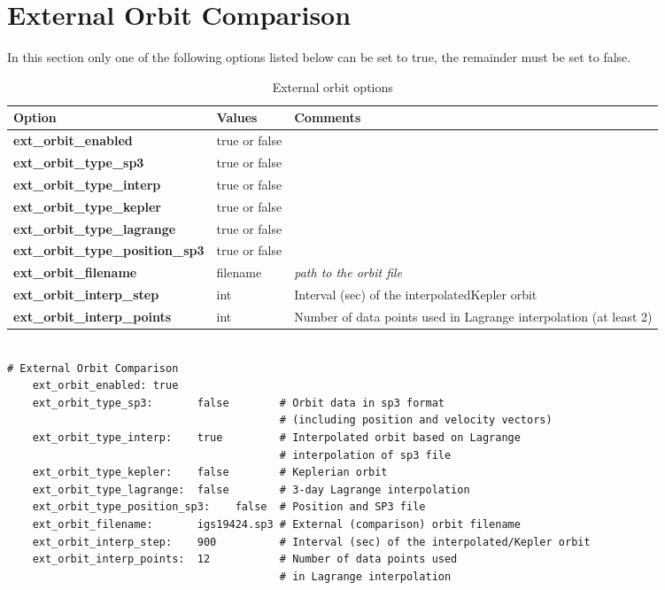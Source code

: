\section{External Orbit Comparison}
In this section only one of the following options listed below can be set to true, the remainder must be set to false.\\
\begin{table}[h!]
\begin{tabular}{|p{4.5cm}|p{2cm}|p{3.5cm}|}
	\hline
	Option & Values & Comments \\
	\hline
	\textbf{ext\_orbit\_enabled}  & true or false & \\
	\textbf{ext\_orbit\_type\_sp3}  & true or false & \\
	\textbf{ext\_orbit\_type\_interp} & true or false & \\
	\textbf{ext\_orbit\_type\_kepler} & true or false & \\
	\textbf{ext\_orbit\_type\_lagrange} & true or false & \\
	\textbf{ext\_orbit\_type\_position\_sp3} & true or false & \\
	\textbf{ext\_orbit\_filename} & filename &  \emph{path to the orbit file}\\
	\textbf{ext\_orbit\_interp\_step} & int & Interval (sec) of the interpolated\/Kepler orbit\\
	\textbf{ext\_orbit\_interp\_points} & int & Number of data points used in Lagrange interpolation (at least 2)\\
    \hline
\end{tabular}
	\caption{External orbit options}
\label{table:yaml}
\end{table}
%
{\small
\begin{lstlisting}[language=xml,caption=orbit arc length yaml configuration example]

# External Orbit Comparison
	ext_orbit_enabled: true
	ext_orbit_type_sp3:       false        # Orbit data in sp3 format 
	                                       # (including position and velocity vectors)
	ext_orbit_type_interp:    true         # Interpolated orbit based on Lagrange 
	                                       # interpolation of sp3 file
	ext_orbit_type_kepler:    false        # Keplerian orbit
	ext_orbit_type_lagrange:  false        # 3-day Lagrange interpolation
	ext_orbit_type_position_sp3:    false  # Position and SP3 file
	ext_orbit_filename:       igs19424.sp3 # External (comparison) orbit filename
	ext_orbit_interp_step:    900          # Interval (sec) of the interpolated/Kepler orbit
	ext_orbit_interp_points:  12           # Number of data points used 
	                                       # in Lagrange interpolation
\end{lstlisting}
}
%
